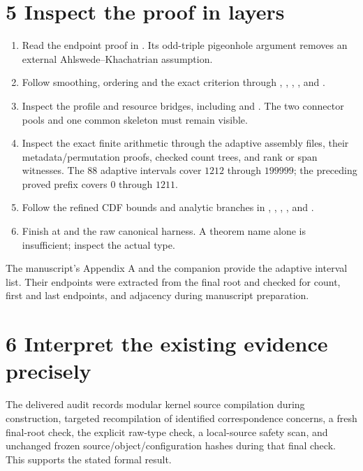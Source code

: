\documentclass[10pt,letterpaper]{article}
\begin{document}
\section*{5 Inspect the proof in layers}
\begin{enumerate}
\item Read the endpoint proof in . Its odd-triple pigeonhole argument removes an external Ahlswede--Khachatrian assumption.
\item Follow smoothing, ordering and the exact criterion through , , , , and .
\item Inspect the profile and resource bridges, including  and . The two connector pools and one common skeleton must remain visible.
\item Inspect the exact finite arithmetic through the adaptive assembly files, their metadata/permutation proofs, checked count trees, and rank or span witnesses. The $88$ adaptive intervals cover $1212$ through $199999$; the preceding proved prefix covers $0$ through $1211$.
\item Follow the refined CDF bounds and analytic branches in , , , , and .
\item Finish at  and the raw canonical harness. A theorem name alone is insufficient; inspect the actual type.
\end{enumerate}
The manuscript's Appendix A and the companion  provide the adaptive interval list. Their endpoints were extracted from the final root and checked for count, first and last endpoints, and adjacency during manuscript preparation.

\section*{6 Interpret the existing evidence precisely}
The delivered audit records modular kernel source compilation during construction, targeted recompilation of identified correspondence concerns, a fresh final-root check, the explicit raw-type check, a local-source safety scan, and unchanged frozen source/object/configuration hashes during that final check. This supports the stated formal result.
\end{document}
